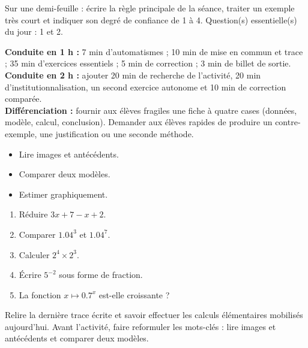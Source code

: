 \begin{exitticket}[3 minutes]Sur une demi-feuille : écrire la règle principale de la séance, traiter un exemple très court et indiquer son degré de confiance de 1 à 4. Question(s) essentielle(s) du jour : 1 et 2.\end{exitticket}

\ifmxteacher
\begin{method}
\textbf{Conduite en 1 h :} 7 min d'automatismes ; 10 min de mise en commun et trace ; 35 min d'exercices essentiels ; 5 min de correction ; 3 min de billet de sortie.\\
\textbf{Conduite en 2 h :} ajouter 20 min de recherche de l'activité, 20 min d'institutionnalisation, un second exercice autonome et 10 min de correction comparée.\\
\textbf{Différenciation :} fournir aux élèves fragiles une fiche à quatre cases (données, modèle, calcul, conclusion). Demander aux élèves rapides de produire un contre-exemple, une justification ou une seconde méthode.
\end{method}
\fi
{}
\begin{objectives}\begin{itemize}\item Lire images et antécédents.\item Comparer deux modèles.\item Estimer graphiquement.\end{itemize}\end{objectives}
\begin{fluency}\begin{enumerate}\item Réduire $3x+7-x+2$. \item Comparer $\num{1,04}^3$ et $\num{1,04}^7$. \item Calculer $2^4\times2^3$. \item Écrire $5^{-2}$ sous forme de fraction. \item La fonction $x\mapsto\num{0,7}^x$ est-elle croissante ? \end{enumerate}\end{fluency}
\begin{prerequisites}Relire la dernière trace écrite et savoir effectuer les calculs élémentaires mobilisés aujourd'hui. Avant l'activité, faire reformuler les mots-clés : lire images et antécédents et comparer deux modèles.\end{prerequisites}

